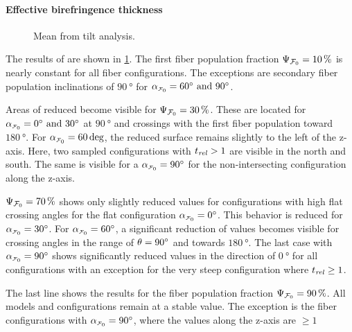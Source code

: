 \paragraph{Effective birefringence thickness \trel{}}
%
\begin{figure}[!p]
    \centering
    \tikzset{external/export next=false}
    \caption{Mean \trel{} from tilt analysis.}
    \label{fig:sim_ana_trel}
\end{figure}
% 
The results of \trel{} are shown in \cref{fig:sim_ana_trel}.
The first fiber population fraction $\textnormal{$\Psi_{\textnormal{$\mathcal{F}_0$}}$}=\SI{10}{\percent}$ 
is nearly constant for all fiber configurations.
The exceptions are secondary fiber population inclinations of $\SI{90}{\degree}$ for $\modelInc=\SIlist{60;90}{\degree}$.
\par
% 
Areas of reduced \trel{} become visible for $\textnormal{$\Psi_{\textnormal{$\mathcal{F}_0$}}$}=\SI{30}{\percent}$.
These are located for $\modelInc=\SIlist{0;30}{\degree}$ at $\SI{90}{\degree}$ and crossings with the first fiber population toward $\SI{180}{\degree}$.
For $\modelInc=\SI{60}{\deg}$, the reduced \trel{} surface remains slightly to the left of the z-axis.
Here, two sampled configurations with $\textnormal{$t_\mathit{rel}$} > 1$ are visible in the north and south.
The same is visible for a $\modelInc=\SI{90}{\degree}$ for the non-intersecting configuration along the z-axis.
\par
% 
$\textnormal{$\Psi_{\textnormal{$\mathcal{F}_0$}}$}=\SI{70}{\percent}$ shows only slightly reduced \trel{} values for configurations with high flat crossing angles for the flat configuration $\modelInc=\SI{0}{\degree}$.
This behavior is reduced for $\modelInc=\SI{30}{\degree}$.
For $\modelInc=\SI{60}{\degree}$, a significant reduction of \trel{} values becomes visible for crossing angles in the range of $\textnormal{$\theta$}=\SI{90}{\degree}$ and towards $\SI{180}{\degree}$.
The last case with $\modelInc=\SI{90}{\degree}$ shows significantly reduced \trel{} values in the direction of $\SI{0}{\degree}$ for all configurations with an exception for the very steep configuration where $\textnormal{$t_\mathit{rel}$} \geq \SI{1}{}$.
\par
% 
The last line shows the results for the fiber population fraction $\textnormal{$\Psi_{\textnormal{$\mathcal{F}_0$}}$}=\SI{90}{\percent}$.
All models and configurations remain at a stable \trel{} value.
The exception is the fiber configurations with $\modelInc=\SI{90}{\degree}$, where the \trel{} values along the z-axis are $\geq \SI{1}{}$
%
